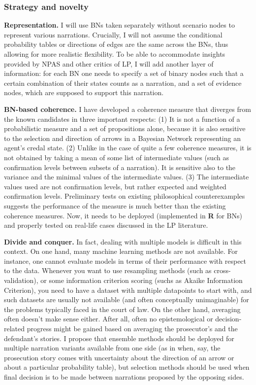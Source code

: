 \documentclass[11pt,dvipsnames,enabledeprecatedfontcommands]{scrartcl}
\begin{document}
\subsubsection{Strategy and novelty}\label{strategy-and-novelty}

\noindent
\textbf{Representation.} I will use BNs taken separately without
scenario nodes to represent various narrations. Crucially, I will not
assume the conditional probability tables or directions of edges are the
same across the BNs, thus allowing for more realistic flexibility. To be
able to accommodate insights provided by NPAS and other critics of LP, I
will add another layer of information: for each BN one needs to specify
a set of binary nodes such that a certain combination of their states
counts as a narration, and a set of evidence nodes, which are supposed
to support this narration.

\noindent
 \textbf{BN-based coherence.} I have developed a coherence measure that
diverges from the known candidates in three important respects: (1) It
is not a function of a probabilistic measure and a set of propositions
alone, because it is also sensitive to the selection and direction of
arrows in a Bayesian Network representing an agent's credal state. (2)
Unlike in the case of quite a few coherence measures, it is not obtained
by taking a mean of some list of intermediate values (such as
confirmation levels between subsets of a narration). It is sensitive
also to the variance and the minimal values of the intermediate values.
(3) The intermediate values used are not confirmation levels, but rather
expected and weighted confirmation levels. Preliminary tests on existing
philosophical counterexamples suggests the performance of the measure is
much better than the existing coherence measures. Now, it needs to be
deployed (implemented in \textbf{\textsf{R}} for BNs) and properly
tested on real-life cases discussed in the LP literature.

\noindent
 \textbf{Divide and conquer.} In fact, dealing with multiple models is
difficult in this context. On one hand, many machine learning methods
are not available. For instance, one cannot evaluate models in terms of
their performance with respect to the data. Whenever you want to use
resampling methods (such as cross-validation), or some information
criterion scoring (suchs as Akaike Information Criterion), you need to
have a dataset with multiple datapoints to start with, and such datasets
are usually not available (and often conceptually unimaginable) for the
problems typically faced in the court of law. On the other hand,
averaging often doesn't make sense either. After all, often no
epistemological or decision-related progress might be gained based on
averaging the prosecutor's and the defendant's stories. I propose that
ensemble methods should be deployed for multiple narration variants
available from one side (as in when, say, the prosecution story comes
with uncertainty about the direction of an arrow or about a particular
probability table), but selection methods should be used when final
decision is to be made between narrations proposed by the opposing
sides.
\end{document}
